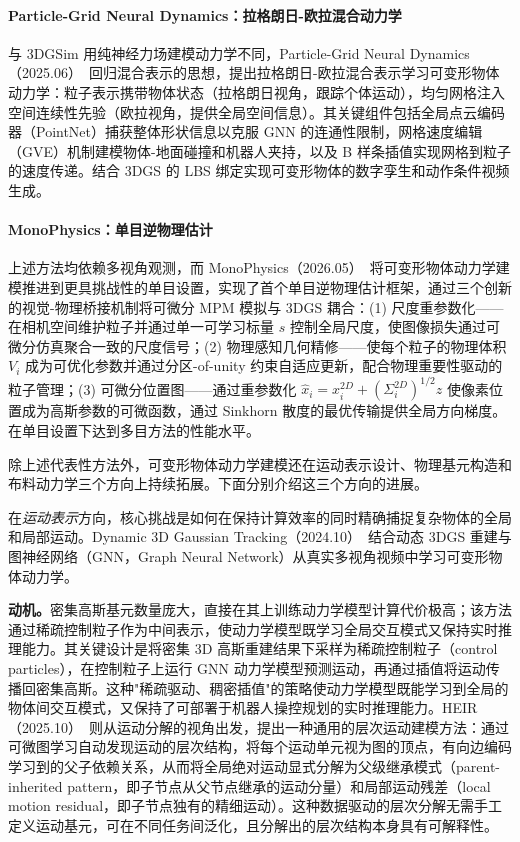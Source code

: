 \paragraph{Particle-Grid Neural Dynamics：拉格朗日-欧拉混合动力学}

与 3DGSim 用纯神经力场建模动力学不同，Particle-Grid Neural Dynamics（2025.06）~\cite{2506_15680}回归混合表示的思想，提出拉格朗日-欧拉混合表示学习可变形物体动力学：粒子表示携带物体状态（拉格朗日视角，跟踪个体运动），均匀网格注入空间连续性先验（欧拉视角，提供全局空间信息）。其关键组件包括全局点云编码器（PointNet）捕获整体形状信息以克服 GNN 的连通性限制，网格速度编辑（GVE）机制建模物体-地面碰撞和机器人夹持，以及 B 样条插值实现网格到粒子的速度传递。结合 3DGS 的 LBS 绑定实现可变形物体的数字孪生和动作条件视频生成。

\paragraph{MonoPhysics：单目逆物理估计}

上述方法均依赖多视角观测，而 MonoPhysics（2026.05）~\cite{2605_30320}将可变形物体动力学建模推进到更具挑战性的单目设置，实现了首个单目逆物理估计框架，通过三个创新的视觉-物理桥接机制将可微分 MPM 模拟与 3DGS 耦合：(1) 尺度重参数化——在相机空间维护粒子并通过单一可学习标量 $s$ 控制全局尺度，使图像损失通过可微分仿真聚合一致的尺度信号；(2) 物理感知几何精修——使每个粒子的物理体积 $V_i$ 成为可优化参数并通过分区-of-unity 约束自适应更新，配合物理重要性驱动的粒子管理；(3) 可微分位置图——通过重参数化 $\hat{x}_i = x_i^{2D} + (\Sigma_i^{2D})^{1/2} z$ 使像素位置成为高斯参数的可微函数，通过 Sinkhorn 散度的最优传输提供全局方向梯度。在单目设置下达到多目方法的性能水平。

除上述代表性方法外，可变形物体动力学建模还在运动表示设计、物理基元构造和布料动力学三个方向上持续拓展。下面分别介绍这三个方向的进展。

在\emph{运动表示}方向，核心挑战是如何在保持计算效率的同时精确捕捉复杂物体的全局和局部运动。Dynamic 3D Gaussian Tracking（2024.10）~\cite{2410_18912}结合动态 3DGS 重建与图神经网络（GNN，Graph Neural Network）从真实多视角视频中学习可变形物体动力学。

\textbf{动机。}密集高斯基元数量庞大，直接在其上训练动力学模型计算代价极高；该方法通过稀疏控制粒子作为中间表示，使动力学模型既学习全局交互模式又保持实时推理能力。其关键设计是将密集 3D 高斯重建结果下采样为稀疏控制粒子（control particles），在控制粒子上运行 GNN 动力学模型预测运动，再通过插值将运动传播回密集高斯。这种"稀疏驱动、稠密插值"的策略使动力学模型既能学习到全局的物体间交互模式，又保持了可部署于机器人操控规划的实时推理能力。HEIR（2025.10）~\cite{2510_26786}则从运动分解的视角出发，提出一种通用的层次运动建模方法：通过可微图学习自动发现运动的层次结构，将每个运动单元视为图的顶点，有向边编码学习到的父子依赖关系，从而将全局绝对运动显式分解为父级继承模式（parent-inherited pattern，即子节点从父节点继承的运动分量）和局部运动残差（local motion residual，即子节点独有的精细运动）。这种数据驱动的层次分解无需手工定义运动基元，可在不同任务间泛化，且分解出的层次结构本身具有可解释性。

